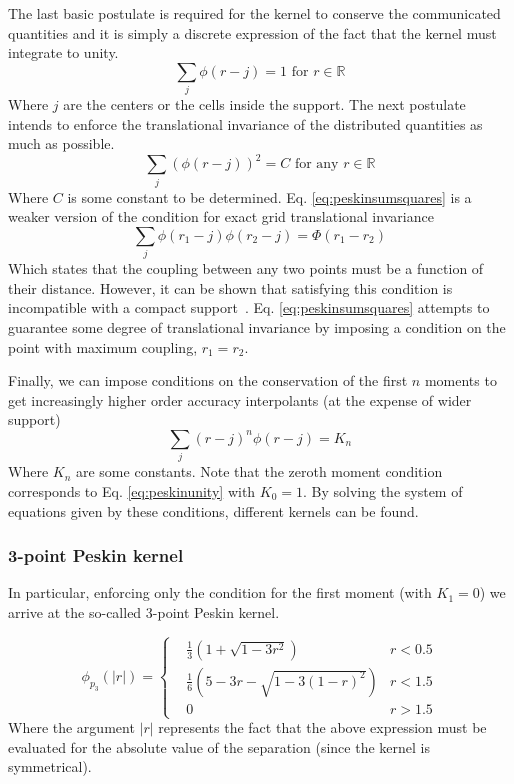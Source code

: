\documentclass[twoside,openright,titlepage,numbers=noenddot,%
headinclude,footinclude,cleardoublepage=empty,abstract=on,
BCOR=5mm,fontsize=11pt, dvipsnames, paper=b5
]{scrreprt}
\begin{document}
The last basic postulate is required for the kernel to conserve the communicated quantities and it is simply a discrete expression of the fact that the kernel must integrate to unity.
\begin{equation}
  \label{eq:peskinunity}
  \sum_j \phi(r-j) = 1 \textrm{ for } r\in\mathbb R
\end{equation}
Where $j$ are the centers or the cells inside the support.
The next postulate intends to enforce the translational invariance of the distributed quantities as much as possible.
\begin{equation}
  \label{eq:peskinsumsquares}
  \sum_j\left(\phi(r-j)\right)^2 = C \textrm{ for any } r\in\mathbb R
\end{equation}
Where $C$ is some constant to be determined. Eq. \eqref{eq:peskinsumsquares} is a weaker version of the condition for exact grid translational invariance
\begin{equation}
  \sum_j\phi(r_1-j)\phi(r_2-j) = \Phi(r_1-r_2)
\end{equation}
Which states that the coupling between any two points must be a function of their distance. However, it can be shown that satisfying this condition is incompatible with a compact support~\cite{Peskin2002}. Eq. \eqref{eq:peskinsumsquares} attempts to guarantee some degree of translational invariance by imposing a condition on the point with maximum coupling, $r_1 = r_2$.

Finally, we can impose conditions on the conservation of the first $n$ moments to get increasingly higher order accuracy interpolants (at the expense of wider support)
\begin{equation}
  \sum_j(r-j)^n\phi(r-j) = K_n
\end{equation}
Where $K_n$ are some constants. Note that the zeroth moment condition corresponds to Eq. \eqref{eq:peskinunity} with $K_0 = 1$.
By solving the system of equations given by these conditions, different kernels can be found. 

\subsubsection*{3-point Peskin kernel}
In particular, enforcing only the condition for the first moment (with $K_1=0$) we arrive at the so-called 3-point Peskin kernel.

\begin{equation}
  \label{eq:peskin3}
  \phi_{p_3}(|r|) =  \left\{
  \begin{aligned}
    & \frac{1}{3}\left( 1 + \sqrt{1-3r^2}\right)& r < 0.5\\
    & \frac{1}{6}\left(5-3r-\sqrt{1-3(1-r)^2}\right)& r < 1.5\\
    & 0 & r>1.5 
  \end{aligned}\right.
\end{equation}
Where the argument $|r|$ represents the fact that the above expression must be evaluated for the absolute value of the separation (since the kernel is symmetrical).
\end{document}
